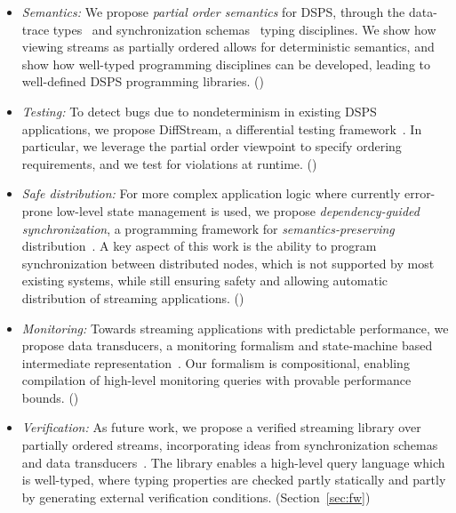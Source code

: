 \begin{itemize}
\item
\emph{Semantics:}
We propose \emph{partial order semantics} for DSPS,
through the data-trace types~\cite{pldi19} and synchronization schemas~\cite{pods21} typing disciplines.
We show how viewing streams as partially ordered allows for deterministic semantics,
and show how well-typed programming disciplines can be developed,
leading to well-defined DSPS programming libraries.
()

\item
\emph{Testing:}
To detect bugs due to nondeterminism in existing DSPS applications,
we propose DiffStream, a differential testing framework~\cite{oopsla20}.
In particular, we leverage the partial order viewpoint to specify
ordering requirements, and we test for violations at runtime.
()

\item
\emph{Safe distribution:}
For more complex application logic where currently error-prone
low-level state management is used,
we propose \emph{dependency-guided synchronization},
a programming framework for \emph{semantics-preserving} distribution~\cite{arxiv21dgs}.
A key aspect of this work is the ability to program
synchronization between distributed nodes, which is not supported
by most existing systems,
while still ensuring safety and allowing automatic distribution
of streaming applications.
()

\item
\emph{Monitoring:}
Towards streaming applications with predictable performance,
we propose data transducers, a monitoring formalism and state-machine based intermediate representation~\cite{popl19}.
Our formalism is compositional, enabling compilation of high-level
monitoring queries with provable performance bounds.
()

\item
\emph{Verification:}
As future work, we propose a verified streaming library
over partially ordered streams, incorporating ideas from synchronization schemas~\cite{pods21} and data transducers~\cite{popl19}.
The library enables a high-level query language which is well-typed,
where typing properties are checked partly statically and partly by
generating external verification conditions.
(Section~\ref{sec:fw})
\end{itemize}
